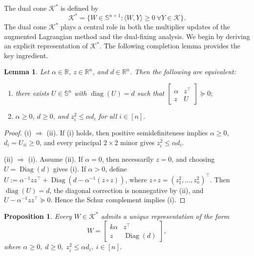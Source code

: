 \documentclass[11pt]{article}
\DeclareMathOperator{\diag}{diag}
\DeclareMathOperator{\Diag}{Diag}
\def\K{\mathcal{K}}
\def\R{\mathbb{R}}
\def\S{\mathbb{S}}
\theoremstyle{plain}
\newtheorem{proposition}{Proposition}
\newtheorem{lemma}{Lemma}
\begin{document}
The dual cone $\K^*$ is defined by
\[\K^*=\{W\in\S^{n+1}:\langle W,Y\rangle\ge 0\ \forall Y\in \K\}.\]
The dual cone $\K^*$ plays a central role in both the multiplier updates of the augmented Lagrangian method and the dual-fixing analysis. We begin by deriving an explicit representation of $\K^*$. The following completion lemma provides the key ingredient.

\begin{lemma}
\label{lem:arrow-psd-completion}
Let $\alpha\in\R$, $z\in\R^n$, and $d\in\R^n$. Then the following are equivalent:
\begin{enumerate}[label=(\roman*), itemsep=0pt, topsep=2pt]
\item there exists $U\in\S^n$ with $\diag(U)=d$ such that
$
\begin{bmatrix}
\alpha & z^\top\\
z & U
\end{bmatrix}\succeq 0;
$
\item $\alpha\ge 0$, $d\ge 0$, and $z_i^2\le \alpha d_i$ for all $i\in[n]$.
\end{enumerate}
\end{lemma}

\begin{proof}\;
(i) $\Rightarrow$ (ii). If (i) holds, then positive semidefiniteness implies $\alpha\ge 0$, $d_i=U_{ii}\ge 0$, and every principal $2\times 2$ minor gives $z_i^2\le \alpha d_i$.

(ii) $\Rightarrow$ (i). Assume (ii). If $\alpha=0$, then necessarily $z=0$, and choosing $U=\Diag(d)$ gives (i). If $\alpha>0$, define $U:=\alpha^{-1}zz^\top+\Diag(d-\alpha^{-1}(z\circ z))$, where $z\circ z=(z_1^2,\dots,z_n^2)^\top$. Then $\diag(U)=d$, the diagonal correction is nonnegative by (ii), and $U-\alpha^{-1}zz^\top\succeq 0$. Hence the Schur complement implies (i).
\end{proof}





\begin{proposition}
\label{prop:Kstar-explicit}
\label{prop:Kstar-parameterization}
Every $W\in\K^*$ admits a unique representation of the form
\[
W=
\begin{bmatrix}
k\alpha & z^\top\\
z & \Diag(d)
\end{bmatrix},
\]
where
$
\alpha\ge 0,\; d\ge 0,\;
z_i^2\le \alpha d_i,\; i\in[n].
$
\end{proposition}
\end{document}
